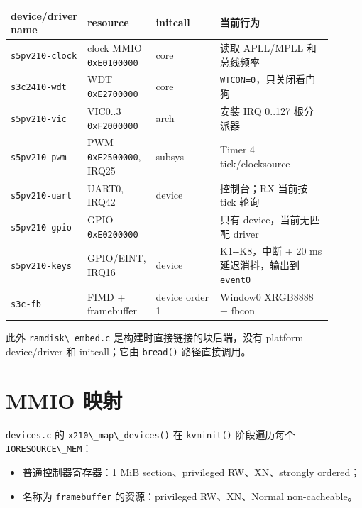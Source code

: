 {\def\LTcaptype{none} %
\begin{longtable}[]{@{}p{0.15\linewidth}p{0.20\linewidth}p{0.20\linewidth}p{0.35\linewidth}@{}}
\toprule\noalign{}
device/driver name & resource & initcall & 当前行为 \\
\midrule\noalign{}
\endhead
\bottomrule\noalign{}
\endlastfoot
\passthrough{\lstinline!s5pv210-clock!} & clock MMIO
\passthrough{\lstinline!0xE0100000!} & core & 读取 APLL/MPLL
和总线频率 \\
\passthrough{\lstinline!s3c2410-wdt!} & WDT
\passthrough{\lstinline!0xE2700000!} & core &
\passthrough{\lstinline!WTCON=0!}，只关闭看门狗 \\
\passthrough{\lstinline!s5pv210-vic!} & VIC0..3
\passthrough{\lstinline!0xF2000000!} & arch & 安装 IRQ 0..127
根分派器 \\
\passthrough{\lstinline!s5pv210-pwm!} & PWM
\passthrough{\lstinline!0xE2500000!}, IRQ25 & subsys & Timer 4
tick/clocksource \\
\passthrough{\lstinline!s5pv210-uart!} & UART0, IRQ42 & device &
控制台；RX 当前按 tick 轮询 \\
\passthrough{\lstinline!s5pv210-gpio!} & GPIO
\passthrough{\lstinline!0xE0200000!} & --- & 只有 device，当前无匹配
driver \\
\passthrough{\lstinline!s5pv210-keys!} & GPIO/EINT, IRQ16 & device &
K1-\/-K8，中断 + 20 ms 延迟消抖，输出到
\passthrough{\lstinline!event0!} \\
\passthrough{\lstinline!s3c-fb!} & FIMD + framebuffer & device order 1 &
Window0 XRGB8888 + fbcon \\
\end{longtable}
}

此外 \passthrough{\lstinline!ramdisk\_embed.c!}
是构建时直接链接的块后端，没有 platform device/driver 和 initcall；它由
\passthrough{\lstinline!bread()!} 路径直接调用。

\section{MMIO 映射}\label{mmio-ux6620ux5c04}

\passthrough{\lstinline!devices.c!} 的
\passthrough{\lstinline!x210\_map\_devices()!} 在
\passthrough{\lstinline!kvminit()!} 阶段遍历每个
\passthrough{\lstinline!IORESOURCE\_MEM!}：

\begin{itemize}
\tightlist
\item
  普通控制器寄存器：1 MiB section、privileged RW、XN、strongly ordered；
\item
  名称为 \passthrough{\lstinline!framebuffer!} 的资源：privileged
  RW、XN、Normal non-cacheable。
\end{itemize}

